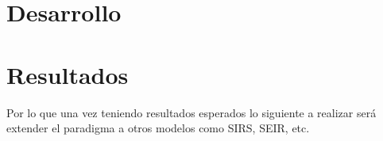\chapter{Desarrollo}



\newpage


\lstset{inputencoding=utf8/latin1}


\chapter{Resultados}

Por lo que una vez teniendo resultados esperados lo siguiente a realizar será extender el paradigma a otros modelos como SIRS, SEIR, etc.



%
